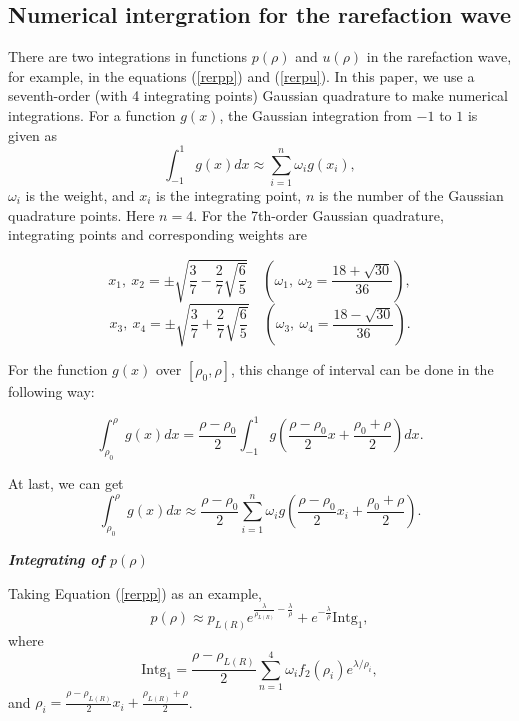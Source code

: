 \documentclass[review]{elsarticle}
\numberwithin{equation}{section}
\numberwithin{table}{section}
\begin{document}
  \appendix
  \begin{appendices}

  \renewcommand{\appendixname}{Appendix\Alph{section}}

  \section{Numerical intergration for the rarefaction wave}
  There are two integrations in  functions $p(\rho)$ and $u(\rho)$ in the rarefaction wave, for example,  in the equations (\ref{rerpp}) and (\ref{rerpu}).  In this paper, we use  a seventh-order (with 4 integrating points) Gaussian quadrature to make numerical integrations.
For a function $g(x)$,  the Gaussian integration from $-1$ to $1$ is given as
$$
\int_{-1}^1 g(x)dx \approx \sum_{i=1}^n \omega_i g(x_i),
$$
$\omega_i$ is the weight, and $x_i$ is the integrating point, $n$ is the number of the Gaussian quadrature points. Here $n =4$. 
For  the  7th-order Gaussian quadrature,  integrating points  and  corresponding weights are

$$x_1, \ x_2 =\pm \sqrt{\frac{3}{7} -\frac{2}{7}\sqrt{\frac{6}{5}}} \quad \left(\omega_1, \  \omega_2 =\frac{18+\sqrt{30}}{36} \right), $$
$$x_3, \ x_4 =\pm \sqrt{\frac{3}{7} +\frac{2}{7}\sqrt{\frac{6}{5}}} \quad \left(\omega_3, \  \omega_4 =\frac{18-\sqrt{30}}{36} \right). $$

For the  function $g(x)$ over $[\rho_0, \rho]$, this change of  interval can be done  in the following way:

$$
\int_{\rho_0}^{\rho}g(x) dx= \frac{\rho-\rho_0}{2}\int_{-1}^{1} g\left(\frac{\rho-\rho_0}{2}x+\frac{\rho_0+\rho}{2}\right)dx .
 $$

At last, we can get
\begin{equation}\label{int1}
  \int_{\rho_0}^{\rho}g(x) dx \approx \frac{\rho-\rho_0}{2}\sum_{i=1}^n \omega_i g\left(\frac{\rho-\rho_0}{2}x_{i}+\frac{\rho_0+\rho}{2}\right).
\end{equation}


 \emph{\textbf{Integrating of $p(\rho)$}}

 Taking Equation (\ref{rerpp}) as an example,
 \begin{equation} \label{eq:app}
  p(\rho) \approx
  p_{L(R)}e^{\frac{\lambda}{\rho_{L(R)}}-\frac{\lambda}{\rho}} +e^{-\frac{\lambda}{\rho}} \text{Intg}_1, %
\end{equation}
where
$$\text{Intg}_1 = \frac{\rho - \rho_{L(R)}}{2} \sum_{n=1}^4 \omega_i f_2(\rho_i) e^{\lambda/\rho_i},$$
and $\rho_i =  \frac{\rho-\rho_{L(R)}}{2}x_i+\frac{\rho_{L(R)}+\rho}{2} $.


\end{appendices}
\end{document}
